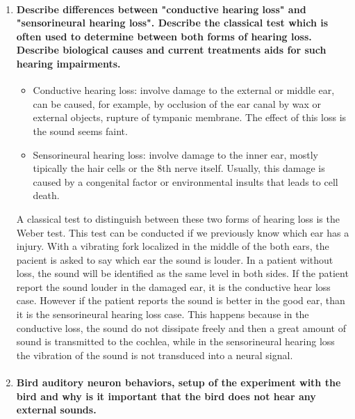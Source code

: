 \documentclass[12pt,article,oneside,a4paper]{memoir}
\begin{document}
\begin{enumerate}
\item \paragraph{Describe differences between "conductive hearing loss" and "sensorineural hearing loss". Describe the classical test which is often used to determine between both forms of hearing loss. Describe biological causes and current treatments aids for such hearing impairments.}
\begin{itemize}
\item Conductive hearing loss: involve damage to the external or middle ear, can be caused, for example, by occlusion of the ear canal by wax or external objects, rupture of tympanic membrane. The effect of this loss is the sound seems faint.
\item Sensorineural hearing loss: involve damage to the inner ear, mostly tipically the hair cells or the 8th nerve itself. Usually, this damage is caused by a congenital factor or environmental insults that leads to cell death.
\end{itemize}
A classical test to distinguish between these two forms of hearing loss is the Weber test. This test can be conducted if we previously know which ear has a injury. With a vibrating fork localized in the middle of the both ears, the pacient is asked to say which ear the sound is louder. In a patient without loss, the sound will be identified as the same level in both sides. If the patient report the sound louder in the damaged ear, it is the conductive hear loss case. However if the patient reports the sound is better in the good ear, than it is the sensorineural hearing loss case. This happens because in the conductive loss, the sound do not dissipate freely and then a great amount of sound is transmitted to the cochlea, while in the sensorineural hearing loss the vibration of the sound is not transduced into a neural signal.

\item \paragraph{Bird auditory neuron behaviors, setup of the experiment with the bird and why is it important that the bird does not hear any external sounds.}

\end{enumerate}

\end{document}
